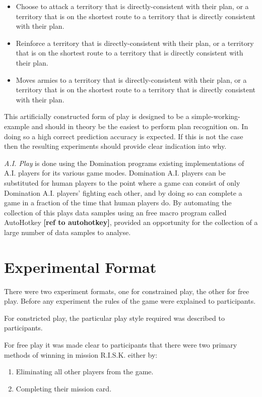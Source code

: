 \documentclass[parskip]{cs4rep}
\begin{document}
\begin{itemize}
\item
Choose to attack a territory that is directly-consistent with their plan, or a territory that is on the shortest route to a territory that is directly consistent with their plan.
\item
Reinforce a territory that is directly-consistent with their plan, or a territory that is on the shortest route to a territory that is directly consistent with their plan.
\item
Moves armies to a territory that is directly-consistent with their plan, or a territory that is on the shortest route to a territory that is directly consistent with their plan.
\end{itemize}

This artificially constructed form of play is designed to be a simple-working-example and should in theory be the easiest to perform plan recognition on. In doing so a high correct prediction accuracy is expected. If this is not the case then the resulting experiments should provide clear indication into why.

\textit{A.I. Play} is done using the Domination programs existing implementations of A.I. players for its various game modes. Domination A.I. players can be substituted for human players to the point where a game can consist of only Domination A.I. players' fighting each other, and by doing so can complete a game in a fraction of the time that human players do. By automating the collection of this plays data samples using an free macro program called AutoHotkey \textbf{[ref to autohotkey]}, provided an opportunity for the collection of a large number of data samples to analyse. 

\section{Experimental Format}

There were two experiment formats, one for constrained play, the other for free play. Before any experiment the rules of the game were explained to participants. 

For constricted play, the particular play style required was described to participants.

For free play it was made clear to participants that there were two primary methods of winning in mission R.I.S.K. either by:

\begin{enumerate}
\item
Eliminating all other players from the game.
\item
Completing their mission card.
\end{enumerate}
\end{document}
